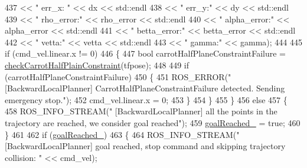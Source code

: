 \begin{DoxyCode}
{437                                                                          << \textcolor{stringliteral}{" err\_x: "} << dx << std::endl
438                                                                          << \textcolor{stringliteral}{" err\_y:"} << dy << std::endl
439                                                                          << \textcolor{stringliteral}{" rho\_error:"} << rho\_error << 
      std::endl
440                                                                          << \textcolor{stringliteral}{" alpha\_error:"} << alpha\_error 
      << std::endl
441                                                                          << \textcolor{stringliteral}{" betta\_error:"} << betta\_error 
      << std::endl
442                                                                          << \textcolor{stringliteral}{" vetta:"} << vetta << std::endl
443                                                                          << \textcolor{stringliteral}{" gamma:"} << gamma);
444 
445                 \textcolor{keywordflow}{if} (cmd\_vel.linear.x != 0)
446                 \{
447                     \textcolor{keywordtype}{bool} carrotHalfPlaneConstraintFailure = 
      \hyperlink{classcl__move__base__z_1_1backward__local__planner_1_1BackwardLocalPlanner_a22938e354a4ec489101295ed7f2539f6}{checkCarrotHalfPlainConstraint}(tfpose);
448 
449                     \textcolor{keywordflow}{if} (carrotHalfPlaneConstraintFailure)
450                     \{
451                         ROS\_ERROR(\textcolor{stringliteral}{"[BackwardLocalPlanner] CarrotHalfPlaneConstraintFailure detected.
       Sending emergency stop."});
452                         cmd\_vel.linear.x = 0;
453                     \}
454                 \}
455             \}
456             \textcolor{keywordflow}{else}
457             \{
458                 ROS\_INFO\_STREAM(\textcolor{stringliteral}{" [BackwardLocalPlanner] all the points in the trajectory are reached, we
       consider goal reached"});
459                 \hyperlink{classcl__move__base__z_1_1backward__local__planner_1_1BackwardLocalPlanner_ad443c52ef585a8eab0364f0909222f51}{goalReached\_} = \textcolor{keyword}{true};
460             \}
461 
462             \textcolor{keywordflow}{if} (\hyperlink{classcl__move__base__z_1_1backward__local__planner_1_1BackwardLocalPlanner_ad443c52ef585a8eab0364f0909222f51}{goalReached\_})
463             \{
464                 ROS\_INFO\_STREAM(\textcolor{stringliteral}{" [BackwardLocalPlanner] goal reached, stop command and skipping trajectory
       collision: "} << cmd\_vel);
}
\end{DoxyCode}

